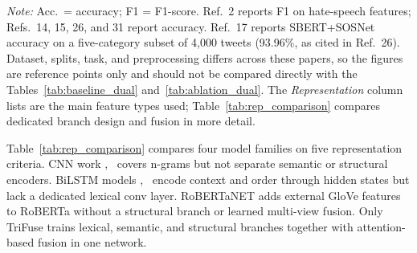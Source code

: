 \begin{table}[!t]
\caption{Comparative Summary of State-of-the-Art Cyberbullying Detection Approaches}
\label{tab:sota_comparison}
\centering
{}
\vspace{2pt}
{\footnotesize \textit{Note:} Acc.\ = accuracy; F1 = F1-score. Ref.~2 reports F1 on hate-speech features; Refs.~14, 15, 26, and 31 report accuracy. Ref.~17 reports SBERT+SOSNet accuracy on a five-category subset of 4,000 tweets (93.96\%, as cited in Ref.~26). Dataset, splits, task, and preprocessing differs across these papers, so the figures are reference points only and should not be compared directly with the Tables~\ref{tab:baseline_dual} and~\ref{tab:ablation_dual}. The \emph{Representation} column lists are the main feature types used; Table~\ref{tab:rep_comparison} compares dedicated branch design and fusion in more detail.}

\end{table}

Table~\ref{tab:rep_comparison} compares four model families on five representation criteria. CNN work \cite{ref7},~\cite{ref26} covers n-grams but not separate semantic or structural encoders. BiLSTM models \cite{ref8},~\cite{ref13} encode context and order through hidden states but lack a dedicated lexical conv layer. RoBERTaNET \cite{ref15} adds external GloVe features to RoBERTa without a structural branch or learned multi-view fusion. Only TriFuse trains lexical, semantic, and structural branches together with attention-based fusion in one network.

